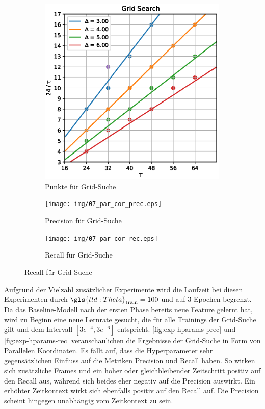 \begin{figure}
    \centering
    \begin{subfigure}{.25\textwidth}
        \centering
        \includegraphics[width=0.99\textwidth, keepaspectratio, interpolate]{img/07_grid_csn.eps}
        \caption{Punkte für Grid-Suche}
        \label{fig:exp-hparams-grid}
    \end{subfigure}%
    \begin{subfigure}{.35\textwidth}
        \centering
        \texttt{[image: img/07\_par\_cor\_prec.eps]}
        \caption{Precision für Grid-Suche}
        \label{fig:exp-hparams-prec}
    \end{subfigure}
    \begin{subfigure}{.35\textwidth}
        \centering
        \texttt{[image: img/07\_par\_cor\_rec.eps]}
        \caption{Recall für Grid-Suche}
        \label{fig:exp-hparams-rec}
    \end{subfigure}
\end{figure}

Aufgrund der Vielzahl zusätzlicher Experimente wird die Laufzeit bei diesen Experimenten durch $\gls{tld:Theta}_\text{train} = 100$ und auf 3 Epochen begrenzt.
Da das Baseline-Modell nach der ersten Phase bereits neue Feature gelernt hat, wird zu Beginn eine neue Lernrate gesucht, die für alle Trainings der Grid-Suche gilt und dem Intervall $[3e^{-4}, 3e^{-6}]$ entspricht.
\autoref{fig:exp-hparams-prec} und \autoref{fig:exp-hparams-rec} veranschaulichen die Ergebnisse der Grid-Suche in Form von Parallelen Koordinaten.
Es fällt auf, dass die Hyperparameter sehr gegensätzlichen Einfluss auf die Metriken Precision und Recall haben.
So wirken sich zusätzliche Frames und ein hoher oder gleichbleibender Zeitschritt positiv auf den Recall aus, während sich beides eher negativ auf die Precision auswirkt.
Ein erhöhter Zeitkontext wirkt sich ebenfalls positiv auf den Recall auf.
Die Precision scheint hingegen unabhängig vom Zeitkontext zu sein.

